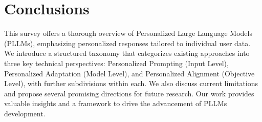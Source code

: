 \section{Conclusions}

This survey offers a thorough overview of Personalized Large Language Models (PLLMs), emphasizing personalized responses tailored to individual user data. We introduce a structured taxonomy that categorizes existing approaches into three key technical perspectives: Personalized Prompting (Input Level), Personalized Adaptation (Model Level), and Personalized Alignment (Objective Level), with further subdivisions within each. We also discuss current limitations and propose several promising directions for future research. Our work provides valuable insights and a framework to drive the advancement of PLLMs development.